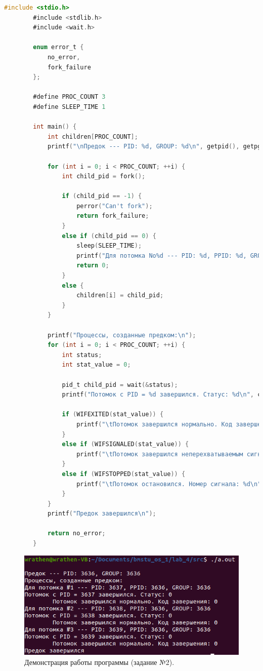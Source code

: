 \documentclass[12pt]{report}
\begin{document}
	\begin{lstlisting}[label=code:wait, caption=wait(), language=C]
		#include <stdio.h>
		#include <stdlib.h>
		#include <wait.h>
		
		enum error_t {
			no_error,
			fork_failure
		};
		
		#define PROC_COUNT 3
		#define SLEEP_TIME 1
		
		int main() {
			int children[PROC_COUNT];
			printf("\nПредок --- PID: %d, GROUP: %d\n", getpid(), getpgrp());
			
			for (int i = 0; i < PROC_COUNT; ++i) {
				int child_pid = fork();
				
				if (child_pid == -1) {
					perror("Can't fork");
					return fork_failure;
				}
				else if (child_pid == 0) {
					sleep(SLEEP_TIME);
					printf("Для потомка No%d --- PID: %d, PPID: %d, GROUP: %d\n", i + 1, getpid(), getppid(), getpgrp());
					return 0;
				}
				else {
					children[i] = child_pid;
				}
			}
			
			printf("Процессы, созданные предком:\n");
			for (int i = 0; i < PROC_COUNT; ++i) {
				int status;
				int stat_value = 0;
				
				pid_t child_pid = wait(&status);
				printf("Потомок с PID = %d завершился. Статус: %d\n", children[i], status);
				
				if (WIFEXITED(stat_value)) {
					printf("\tПотомок завершился нормально. Код завершения: %d\n", WEXITSTATUS(stat_value));
				}
				else if (WIFSIGNALED(stat_value)) {
					printf("\tПотомок завершился неперехватываемым сигналом. Номер сигнала: %d\n", WTERMSIG(stat_value));
				}
				else if (WIFSTOPPED(stat_value)) {
					printf("\tПотомок остановился. Номер сигнала: %d\n", WSTOPSIG(stat_value));
				}
			}
			printf("Предок завершился\n");
			
			return no_error;
		}
	\end{lstlisting}

	\begin{figure}[H]
	
		\centering
		
		\includegraphics[width=\linewidth]{img/task_02.png}
		\caption{Демонстрация работы программы (задание №2).}
		
		\label{fig:task_02}
	
	\end{figure}
\end{document}
